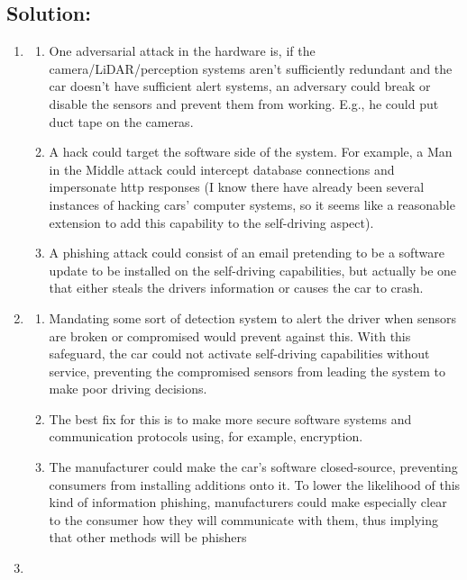 \documentclass[submit]{harvardml}
\newenvironment{ans}{
  \begin{enumerate}
  \color{blue}
}{
  \end{enumerate}
  \color{black}
}
\begin{document}
\newpage

\subsection*{Solution:}
\begin{ans}
    \item 
    \begin{enumerate}
        \item One adversarial attack in the hardware is, if the camera/LiDAR/perception systems aren’t sufficiently redundant and the car doesn’t have sufficient alert systems, an adversary could break or disable the sensors and prevent them from working. E.g., he could put duct tape on the cameras. 
        \item A hack could target the software side of the system. For example, a Man in the Middle attack could intercept database connections and impersonate http responses (I know there have already been several instances of hacking cars' computer systems, so it seems like a reasonable extension to add this capability to the self-driving aspect). 
        \item A phishing attack could consist of an email pretending to be a software update to be installed on the self-driving capabilities, but actually be one that either steals the drivers information or causes the car to crash. 
    \end{enumerate}
    \item \begin{enumerate}
        \item Mandating some sort of detection system to alert the driver when sensors are broken or compromised would prevent against this. With this safeguard, the car could not activate self-driving capabilities without service, preventing the compromised sensors from leading the system to make poor driving decisions. 
        \item The best fix for this is to make more secure software systems and communication protocols using, for example, encryption. 
        \item The manufacturer could make the car's software closed-source, preventing consumers from installing additions onto it. To lower the likelihood of this kind of information phishing, manufacturers could make especially clear to the consumer how they will communicate with them, thus implying that other methods will be phishers
    \end{enumerate}
    \item \begin{enumerate}

\end{enumerate}
\end{ans}
\end{document}
